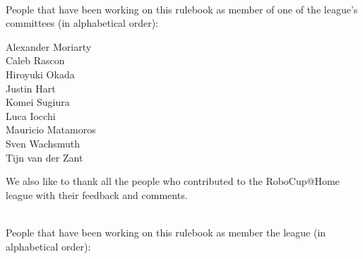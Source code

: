 ~\\\noindent People that have been working on this rulebook as member of one of the league's committees (in alphabetical order):
\begin{center}
\begin{minipage}{0.8\textwidth}
\begin{multicols}{3}%
\footnotesize
\noindent%

Alexander Moriarty\\
Caleb Rascon\\
Hiroyuki Okada\\
\columnbreak
Justin Hart\\
Komei Sugiura\\
Luca Iocchi\\
\columnbreak
Mauricio Matamoros\\
Sven Wachsmuth\\
Tijn van der Zant\\
\end{multicols}
\end{minipage}
\end{center}

We also like to thank all the people who contributed to the RoboCup@Home league with their feedback and comments.

~\\\noindent People that have been working on this rulebook as member the league (in alphabetical order):
\begin{center}
\begin{minipage}{0.8\textwidth}
\end{minipage}
\end{center}


